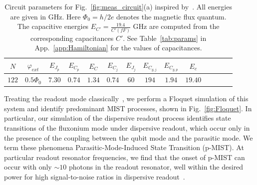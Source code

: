 \documentclass[%
reprint,
superscriptaddress,
 amsmath,amssymb,
 aps,
 prx,
longbibliography,
floatfix,
]{revtex4-2}
\begin{document}
\begin{table}[h]
\centering
\begin{tabular}{|c|c|c|c|c|c|c|c|c|c|c|c|c|c|}
    \hline
     $N$&$\varphi_{ext}$ & $E_{J_p}$ & $E_{C_p}$&$E_C$&$E_{C_j}$& $E_{J_j}$& $E_{C_{g,j}}$&$E_{C_{g,p}}$&$E_c$\\
     \hline
$122$&$0.5\Phi_0$& $7.30$ & $0.74$ &$1.34$&$0.74$ & $60$ & $194$ &$1.94$ &$19.40$\\   \hline
\end{tabular}
\caption{Circuit parameters for Fig.~\ref{fig:meas_circuit}(a) inspired by~\cite{zhang_universal_2021}. All energies are given in GHz. Here $\Phi_0=h/2e$ denotes the magnetic flux quantum. The capacitive energies $E_{C'}=\frac{19.4}{{C'}(fF)}$ GHz are computed from the corresponding capacitances $C'$. See Table~\ref{tab:params} in App.~\ref{app:Hamiltonian} for the values of capacitances.}
\label{tab:circuit_params}
\end{table}

Treating the readout mode classically~\cite{cohen2023reminiscence,dumas2024unified}, we perform a Floquet simulation of this system and identify predominant MIST processes, shown in Fig.~\ref{fig:Floquet}. In particular, our simulation of the dispersive readout process identifies state transitions of the fluxonium mode under dispersive readout, which occur only in the presence of the coupling between the qubit mode and the parasitic mode. We term these phenomena Parasitic-Mode-Induced State Transition (p-MIST). At particular readout resonator frequencies, we find that the onset of p-MIST  can occur with only $\sim 10$ photons in the readout resonator, well within the desired power for high signal-to-noise ratios in dispersive readout~\cite{gusenkova2021quantum}.
\end{document}
